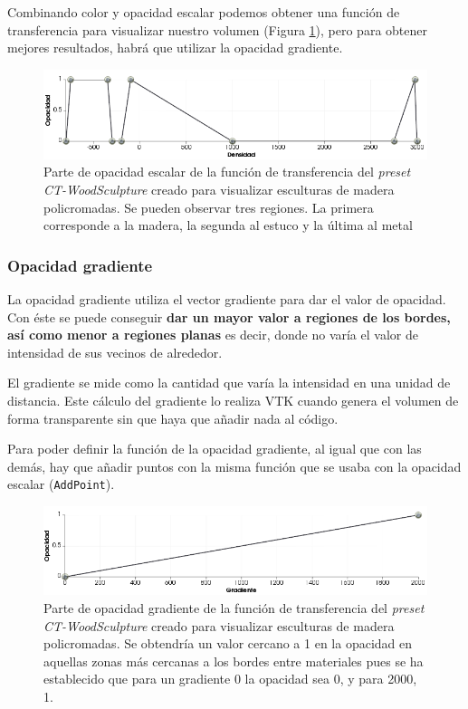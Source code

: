 Combinando color y opacidad escalar podemos obtener una función de transferencia para visualizar nuestro volumen (Figura \ref{fig:opacity_tf}), pero para obtener mejores resultados, habrá que utilizar la opacidad gradiente. 

\begin{figure}[H]
	\centering
	\includegraphics[width=12.5cm]{imagenes/opacity_tf}
	\caption{Parte de opacidad escalar de la función de transferencia del \textit{preset} \textit{CT-WoodSculpture} creado para visualizar esculturas de madera policromadas. Se pueden observar tres regiones. La primera corresponde a la madera, la segunda al estuco y la última al metal}
	\label{fig:opacity_tf}
\end{figure}

\subsubsection{Opacidad gradiente}

La opacidad gradiente utiliza el vector gradiente para dar el valor de opacidad. Con éste se puede conseguir \textbf{dar un mayor valor a regiones de los bordes, así como menor a regiones planas} es decir, donde no varía el valor de intensidad de sus vecinos de alrededor.

El gradiente se mide como la cantidad que varía la intensidad en una unidad de distancia. Este cálculo del gradiente lo realiza VTK cuando genera el volumen de forma transparente sin que haya que añadir nada al código.

Para poder definir la función de la opacidad gradiente, al igual que con las demás, hay que añadir puntos con la misma función que se usaba con la opacidad escalar (\texttt{AddPoint}). 

\begin{figure}[H]
	\centering
	\includegraphics[width=12.5cm]{imagenes/gradient_tf}
	\caption{Parte de opacidad gradiente de la función de transferencia del \textit{preset} \textit{CT-WoodSculpture} creado para visualizar esculturas de madera policromadas. Se obtendría un valor cercano a 1 en la opacidad en aquellas zonas más cercanas a los bordes entre materiales pues se ha establecido que para un gradiente 0 la opacidad sea 0, y para 2000, 1. }
	\label{fig:gradient_tf}
\end{figure}
